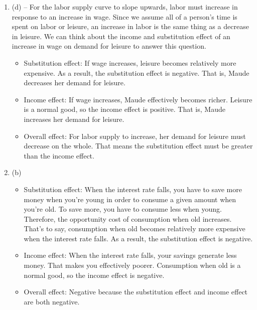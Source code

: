 \documentclass{article}
\begin{document}
\begin{enumerate}
\begin{itemize}
	\item If the income effect is positive in response to a decrease in purchasing power, pasta must be an inferior good.
	
	\end{itemize}

\item (d) -- For the labor supply curve to slope upwards, labor must increase in response to an increase in wage. Since we assume all of a person's time is spent on labor or leisure, an increase in labor is the same thing as a decrease in leisure. We can think about the income and substitution effect of an increase in wage on demand for leisure to answer this question.

	\begin{itemize}
	
	\item Substitution effect: If wage increases, leisure becomes relatively more expensive. As a result, the substitution effect is negative. That is, Maude decreases her demand for leisure.
	
	\item Income effect: If wage increases, Maude effectively becomes richer. Leisure is a normal good, so the income effect is positive. That is, Maude increases her demand for leisure.
	
	\item Overall effect: For labor supply to increase, her demand for leisure must decrease on the whole. That means the substitution effect must be greater than the income effect.
	
	\end{itemize}

\item (b)

	\begin{itemize}
	
	\item Substitution effect: When the interest rate falls, you have to save more money when you're young in order to consume a given amount when you're old. To save more, you have to consume less when young. Therefore, the opportunity cost of consumption when old increases. That's to say, consumption when old becomes relatively more expensive when the interest rate falls. As a result, the substitution effect is negative.
	
	\item Income effect: When the interest rate falls, your savings generate less money. That makes you effectively poorer. Consumption when old is a normal good, so the income effect is negative.
	
	\item Overall effect: Negative because the substitution effect and income effect are both negative.
	
	\end{itemize}

\end{enumerate}
\end{document}
